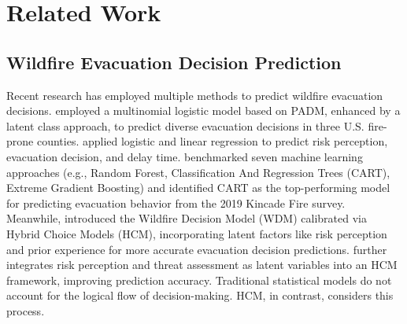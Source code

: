 \section{Related Work}
\vspace{-0.2cm}

\subsection{Wildfire Evacuation Decision Prediction}
\vspace{-0.2cm}
Recent research has employed multiple methods to predict wildfire evacuation decisions.
\citet{mccaffrey2018should} employed a multinomial logistic model based on PADM, enhanced by a latent class approach, to predict diverse evacuation decisions in three U.S. fire-prone counties. 
\citet{forrister2024analyzing} applied logistic and linear regression to predict risk perception, evacuation decision, and delay time.
\citet{xu2023predicting} benchmarked seven machine learning approaches (e.g., Random Forest, Classification And Regression Trees (CART), Extreme Gradient Boosting) and identified CART as the top-performing model for predicting evacuation behavior from the 2019 Kincade Fire survey.
Meanwhile, \citet{lovreglio2020calibrating} introduced the Wildfire Decision Model (WDM) calibrated via Hybrid Choice Models (HCM), incorporating latent factors like risk perception and prior experience for more accurate evacuation decision predictions.
\citet{sun4953233investigating} further integrates risk perception and threat assessment as latent variables into an HCM framework, improving prediction accuracy.
Traditional statistical models do not account for the logical flow of decision-making. HCM, in contrast, considers this process.




\vspace{-0.2cm}
